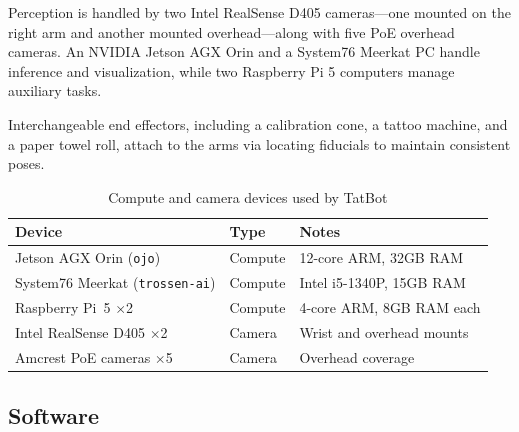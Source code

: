 \documentclass[11pt]{article}
\begin{document}
Perception is handled by two Intel RealSense D405 cameras---one mounted on the right arm and another mounted overhead---along with five PoE overhead cameras. An NVIDIA Jetson AGX Orin and a System76 Meerkat PC handle inference and visualization, while two Raspberry Pi 5 computers manage auxiliary tasks.

Interchangeable end effectors, including a calibration cone, a tattoo machine, and a paper towel roll, attach to the arms via locating fiducials to maintain consistent poses.

\begin{table}[h]
    \centering
    \caption{Compute and camera devices used by TatBot}
    \label{tab:hardware-devices}
    \begin{tabular}{lll}
        \toprule
        Device & Type & Notes \\
        \midrule
        Jetson AGX Orin (\texttt{ojo}) & Compute & 12-core ARM, 32GB RAM \\
        System76 Meerkat (\texttt{trossen-ai}) & Compute & Intel i5-1340P, 15GB RAM \\
        Raspberry Pi~5 $\times$2 & Compute & 4-core ARM, 8GB RAM each \\
        Intel RealSense D405 $\times$2 & Camera & Wrist and overhead mounts \\
        Amcrest PoE cameras $\times$5 & Camera & Overhead coverage \\
        \bottomrule
    \end{tabular}
\end{table}

\subsection{Software}
\end{document}
